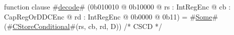 function clause #\hyperref[sailMIPSzdecode]{decode}# (0b010010 @ 0b10000 @ rs : IntRegEnc @ cb : CapRegOrDDCEnc @ rd : IntRegEnc @ 0b0000 @ 0b11) = #\hyperref[sailMIPSzSome]{Some}#(#\hyperref[sailMIPSzCStoreConditional]{CStoreConditional}#(rs, cb, rd, D)) /* CSCD */
